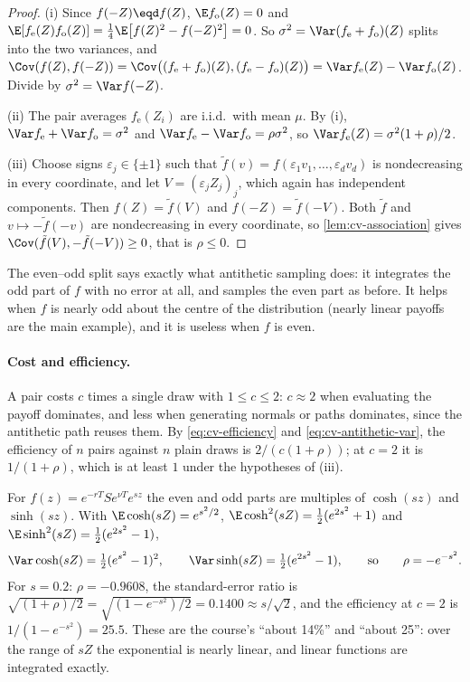 \begin{proof}
(i) Since $f(-Z)\eqd f(Z)$, $\E f_{\mathrm o}(Z)=0$ and
$\E[f_{\mathrm e}(Z)f_{\mathrm o}(Z)]=\frac14\E\big[f(Z)^2-f(-Z)^2\big]=0$. So
$\sigma^2=\Var(f_{\mathrm e}+f_{\mathrm o})(Z)$ splits into the two variances, and
$\Cov(f(Z),f(-Z))=\Cov\big((f_{\mathrm e}+f_{\mathrm o})(Z),(f_{\mathrm e}-f_{\mathrm o})(Z)\big)
=\Var f_{\mathrm e}(Z)-\Var f_{\mathrm o}(Z)$. Divide by $\sigma^2=\Var f(-Z)$.

(ii) The pair averages $f_{\mathrm e}(Z_i)$ are i.i.d.\ with mean $\mu$. By (i),
$\Var f_{\mathrm e}+\Var f_{\mathrm o}=\sigma^2$ and $\Var f_{\mathrm e}-\Var f_{\mathrm o}=\rho\sigma^2$, so
$\Var f_{\mathrm e}(Z)=\sigma^2(1+\rho)/2$.

(iii) Choose signs $\varepsilon_j\in\{\pm1\}$ such that
$\tilde f(v)=f(\varepsilon_1v_1,\dots,\varepsilon_dv_d)$ is nondecreasing in every coordinate, and
let $V=(\varepsilon_jZ_j)_j$, which again has independent components. Then $f(Z)=\tilde f(V)$
and $f(-Z)=\tilde f(-V)$. Both $\tilde f$ and $v\mapsto-\tilde f(-v)$ are nondecreasing in every
coordinate, so \cref{lem:cv-association} gives $\Cov(\tilde f(V),-\tilde f(-V))\ge0$, that is
$\rho\le0$.
\end{proof}

The even--odd split says exactly what antithetic sampling does: it integrates the odd part
of $f$ with no error at all, and samples the even part as before. It helps when $f$ is
nearly odd about the centre of the distribution (nearly linear payoffs are the main
example), and it is useless
when $f$ is even.

\paragraph{Cost and efficiency.} A pair costs $c$ times a single draw with $1\le c\le2$:
$c\approx2$ when evaluating the payoff dominates, and less when generating normals or paths
dominates, since the antithetic path reuses them. By \eqref{eq:cv-efficiency} and
\eqref{eq:cv-antithetic-var}, the efficiency of $n$ pairs against $n$ plain draws is
$2/(c(1+\rho))$; at $c=2$ it is $1/(1+\rho)$, which is at least $1$ under the hypotheses of
(iii).

\begin{example}\label{eg:cv-stock}
For $f(z)=e^{-rT}Se^{\nu T}e^{sz}$ the even and odd parts are multiples of $\cosh(sz)$ and
$\sinh(sz)$. With $\E\cosh(sZ)=e^{s^2/2}$, $\E\cosh^2(sZ)=\frac12(e^{2s^2}+1)$ and
$\E\sinh^2(sZ)=\frac12(e^{2s^2}-1)$,
\[
  \Var\cosh(sZ)=\tfrac12(e^{s^2}-1)^2,\qquad \Var\sinh(sZ)=\tfrac12(e^{2s^2}-1),
  \qquad\text{so}\qquad \rho=-e^{-s^2} .
\]
For $s=0.2$: $\rho=-0.9608$, the standard-error ratio is
$\sqrt{(1+\rho)/2}=\sqrt{(1-e^{-s^2})/2}=0.1400\approx s/\sqrt2$, and the efficiency at
$c=2$ is $1/(1-e^{-s^2})=25.5$. These are the course's ``about 14\%'' and ``about 25'':
over the range of $sZ$ the exponential is nearly linear, and linear functions are
integrated exactly.
\end{example}

